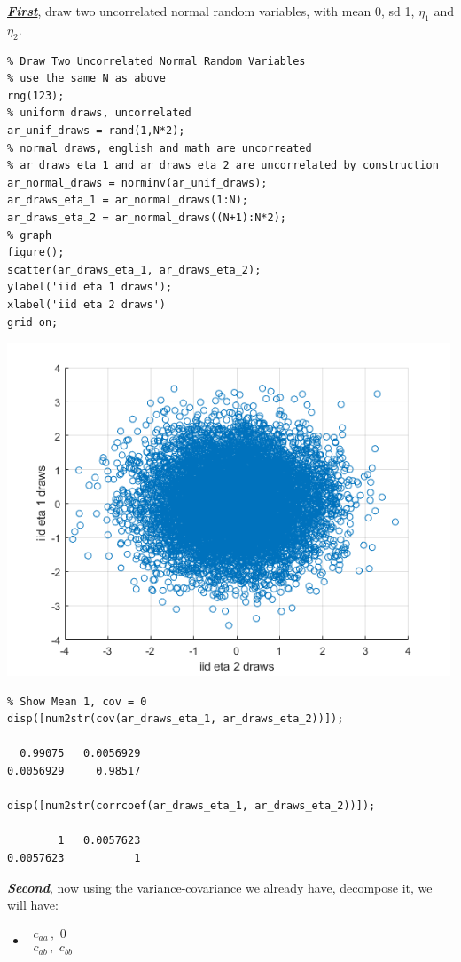 \documentclass[
]{book}
\providecommand{\tightlist}{%
  \setlength{\itemsep}{0pt}\setlength{\parskip}{0pt}}
\begin{document}
\underline{\textbf{\emph{First}}}, draw two uncorrelated normal random variables, with
mean 0, sd 1, \(\eta_1\) and \(\eta_2\).

\begin{verbatim}
% Draw Two Uncorrelated Normal Random Variables
% use the same N as above
rng(123);
% uniform draws, uncorrelated
ar_unif_draws = rand(1,N*2);
% normal draws, english and math are uncorreated
% ar_draws_eta_1 and ar_draws_eta_2 are uncorrelated by construction
ar_normal_draws = norminv(ar_unif_draws);
ar_draws_eta_1 = ar_normal_draws(1:N);
ar_draws_eta_2 = ar_normal_draws((N+1):N*2);
% graph
figure();
scatter(ar_draws_eta_1, ar_draws_eta_2);
ylabel('iid eta 1 draws');
xlabel('iid eta 2 draws')
grid on;
\end{verbatim}

\includegraphics[width=5.20833in,height=\textheight]{img/fs_cholesky_decomposition_images/figure_1.png}

\begin{verbatim}
% Show Mean 1, cov = 0
disp([num2str(cov(ar_draws_eta_1, ar_draws_eta_2))]);

  0.99075   0.0056929
0.0056929     0.98517

disp([num2str(corrcoef(ar_draws_eta_1, ar_draws_eta_2))]);

        1   0.0057623
0.0057623           1
\end{verbatim}

\underline{\textbf{\emph{Second}}}, now using the variance-covariance we already have,
decompose it, we will have:

\begin{itemize}
\tightlist
\item
  \(\displaystyle \begin{array}{l} c_{aa} \,,\,\,0\\ c_{ab} \,,\,\,c_{bb} \end{array}\)
\end{itemize}
\end{document}

